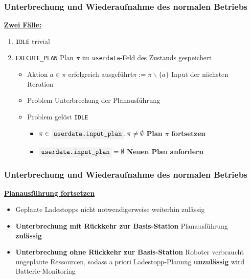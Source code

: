 \documentclass{beamer}
\newcommand{\code}[1]{\colorbox{light-gray}{\texttt{#1}}}
\begin{document}
\begin{frame}
  \frametitle{Unterbrechung und Wiederaufnahme des normalen Betriebs}
  \underline{\textbf{Zwei Fälle:}}
  \begin{enumerate}
    \item \code{IDLE} \textrightarrow \thinspace trivial
    \item \code{EXECUTE\_PLAN} \textrightarrow \thinspace Plan $\pi$ im \code{userdata}-Feld des Zustands gespeichert
    \begin{itemize}
      \item Aktion $a \in \pi$ erfolgreich ausgeführt\newline \textrightarrow \thinspace $\pi := \pi \backslash \{a\}$ Input der nächsten Iteration
      \item Problem \textrightarrow \thinspace Unterbrechung der Planausführung
      \item Problem gelöst \textrightarrow \thinspace \code{IDLE} 
      \begin{itemize}
        \item $\pi \in \code{userdata.input\_plan}, \pi \neq \emptyset$ \textrightarrow \thinspace \textbf{Plan $\pi$ fortsetzen}
        \item $\code{userdata.input\_plan} = \emptyset$ \textrightarrow \thinspace \textbf{Neuen Plan anfordern}
      \end{itemize}
    \end{itemize}
  \end{enumerate}
\end{frame}

\begin{frame}
  \frametitle{Unterbrechung und Wiederaufnahme des normalen Betriebs}
  \underline{\textbf{Planausführung fortsetzen}}
  \begin{itemize}
    \item Geplante Ladestopps nicht notwendigerweise weiterhin zulässig
    \item \textbf{Unterbrechung mit Rückkehr zur Basis-Station} \textrightarrow \thinspace Planausführung \textbf{zulässig}
    \item \textbf{Unterbrechung ohne Rückkehr zur Basis-Station} \textrightarrow \thinspace Roboter verbraucht ungeplante Ressourcen, sodass a priori Ladestopp-Planung
    \textbf{unzulässig} wird \textrightarrow \thinspace Batterie-Monitoring
  \end{itemize}
\end{frame}
\end{document}
